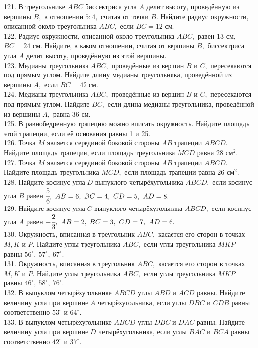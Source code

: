 121. В треугольнике $ABC$ биссектриса угла $A$ делит высоту, проведённую из вершины $B,$ в отношении $5:4,$ считая от точки $B.$ Найдите радиус окружности, описанной около треугольника $ABC,$ если $BC=12$ см.\\
122. Радиус окружности, описанной около треугольника $ABC,$ равен 13 см, $BC=24$ см. Найдите, в каком отношении, считая от вершины $B,$ биссектриса угла $A$ делит высоту, проведённую из этой вершины.\\
123. Медианы треугольника $ABC,$ проведённые из вершин $B$ и $C,$ пересекаются под прямым углом. Найдите длину медианы треугольника, проведённой из вершины $A,$ если $BC=42$ см.\\
124. Медианы треугольника $ABC,$ проведённые из вершин $B$ и $C,$ пересекаются под прямым углом. Найдите $BC,$ если длина медианы треугольника, проведённой из вершины $A,$ равна 36 см.\\
125. В равнобедренную трапецию можно вписать окружность. Найдите площадь этой трапеции, если её основания равны 1 и 25.\\
126. Точка $M$ является серединой боковой стороны $AB$ трапеции $ABCD.$ Найдите площадь трапеции, если площадь треугольника $MCD$ равна $28\text{ см}^2.$\\
127. Точка $M$ является серединой боковой стороны $AB$ трапеции $ABCD.$ Найдите площадь треугольника $MCD,$ если площадь  трапеции равна $26\text{ см}^2.$\\
128. Найдите косинус угла $D$ выпуклого четырёхугольника $ABCD,$ если косинус угла $B$ равен $\cfrac{5}{6},\ AB=6,\ BC=4,\ CD=5,\ AD=8.$\\
129. Найдите косинус угла $C$ выпуклого четырёхугольника $ABCD,$ если косинус угла $A$ равен $-\cfrac{2}{3},\ AB=2,\ BC=3,\ CD=7,\ AD=6.$\\
130. Окружность, вписанная в треугольник $ABC,$ касается его сторон в точках $M, K$ и $P.$ Найдите углы треугольника $ABC,$ если углы треугольника $MKP$ равны $56^\circ,\ 57^\circ,\ 67^\circ.$\\
131. Окружность, вписанная в треугольник $ABC,$ касается его сторон в точках $M, K$ и $P.$ Найдите углы треугольника $ABC,$ если углы треугольника $MKP$ равны $46^\circ,\ 58^\circ,\ 76^\circ.$\\
132. В выпуклом четырёхугольнике $ABCD$ углы $ABD$ и $ACD$ равны. Найдите величину угла при вершине $A$ четырёхугольника, если углы $DBC$ и $CDB$ равны соответственно $53^\circ$ и $64^\circ.$\\
133. В выпуклом четырёхугольнике $ABCD$ углы $DBC$ и $DAC$ равны. Найдите величину угла при вершине $D$ четырёхугольника, если углы $BAC$ и $BCA$ равны соответственно $42^\circ$ и $37^\circ.$\\
